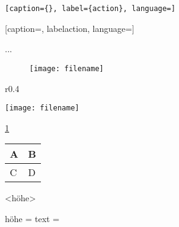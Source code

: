 \begin{lstlisting}[caption={}, label={action}, language=]
\end{lstlisting}

[caption={}, label{action}, language=]

\begin{framed}...\end{framed}



\begin{figure}[H]
\begin{center}
	\texttt{[image: filename]}
	\caption{}
	\label{}
\end{center}
\end{figure}

\begin{wrapfigure}{r}{0.4\textwidth} %
	\vspace{-35pt} %
	\begin{center}
		\texttt{[image: filename]}
	\end{center}
	\vspace{-10pt} %
\end{wrapfigure}



\ref{}

\cite{}



\bgroup
\def\arraystretch{1.5}
\begin{tabular*}{\textwidth}{m{}|m{}}
	A & B\\
	\hline C & D\\
\end{tabular*} 
\egroup


\parbox[c]{2mm}{<höhe>}
 höhe =  
 text = 

